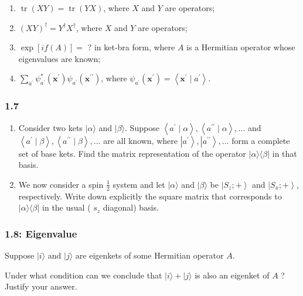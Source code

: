 \documentclass[11pt]{article}
\begin{document}
\begin{enumerate}
\item \(\operatorname{tr}(X Y)=\operatorname{tr}(Y X)\), where \(X\) and \(Y\) are operators;

\item \((X Y)^{\dagger}=Y^{\dagger} X^{\dagger}\), where \(X\) and \(Y\) are operators;

\item \(\exp [i f(A)]=\) ? in ket-bra form, where \(A\) is a Hermitian operator whose eigenvalues are known;

\item \(\sum_{a^{\prime}} \psi_{a^{\prime}}^*\left(\mathbf{x}^{\prime}\right) \psi_{a^{\prime}}\left(\mathbf{x}^{\prime \prime}\right)\), where \(\psi_{a^{\prime}}\left(\mathbf{x}^{\prime}\right)=\left\langle\mathbf{x}^{\prime} \mid a^{\prime}\right\rangle\).
\end{enumerate}
\subsubsection{1.7}
\label{sec:orgcd0f523}
\begin{enumerate}
\item Consider two kets \(|\alpha\rangle\) and \(|\beta\rangle\). Suppose \(\left\langle a^{\prime} \mid \alpha\right\rangle,\left\langle a^{\prime \prime} \mid \alpha\right\rangle, \ldots\) and \(\left\langle a^{\prime} \mid \beta\right\rangle,\left\langle a^{\prime \prime} \mid \beta\right\rangle, \ldots\) are all known, where \(\left|a^{\prime}\right\rangle,\left|a^{\prime \prime}\right\rangle, \ldots\) form a complete set of base kets. Find the matrix representation of the operator \(|\alpha\rangle\langle\beta|\) in that basis.
\item We now consider a spin \(\frac{1}{2}\) system and let \(|\alpha\rangle\) and \(|\beta\rangle\) be \(\left|S_z ;+\right\rangle\) and \(\left|S_x ;+\right\rangle\), respectively. Write down explicitly the square matrix that corresponds to \(|\alpha\rangle\langle\beta|\) in the usual ( \(s_z\) diagonal) basis.
\end{enumerate}
\subsubsection{1.8: Eigenvalue}
\label{sec:orga890fc0}
Suppose \(|i\rangle\) and \(|j\rangle\) are eigenkets of some Hermitian operator
\(A\).

Under what condition can we conclude that \(|i\rangle+|j\rangle\) is also an
eigenket of \(A\) ? Justify your answer.
\end{document}
